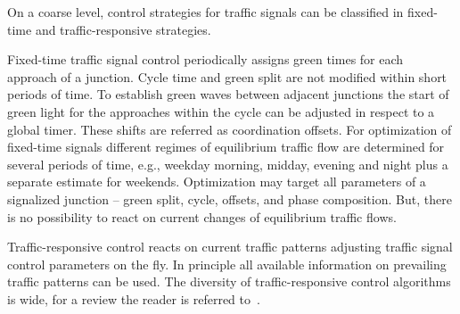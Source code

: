 On a coarse level, control strategies for traffic signals can be classified in fixed-time and traffic-responsive strategies. 

Fixed-time traffic signal control periodically assigns green times for each approach of a junction. 
Cycle time and green split are not modified within short periods of time. 
To establish green waves between adjacent junctions the start of green light for the approaches within the cycle can be adjusted in respect to a global timer. 
These shifts are referred as coordination offsets. 
For optimization of fixed-time signals different regimes of equilibrium traffic flow are determined for several periods of time, e.g., weekday morning, midday, evening and night plus a separate estimate for weekends.   
Optimization may target all parameters of a signalized junction -- green split, cycle, offsets, and phase composition. 
But, there is no possibility to react on current changes of equilibrium traffic flows. 

Traffic-responsive control reacts on current traffic patterns adjusting traffic signal control parameters on the fly. 
In principle all available information on prevailing traffic patterns can be used. 
The diversity of traffic-responsive control algorithms is wide, for a review the reader is referred to~\citet[][]{Grether2014PhD}. 

